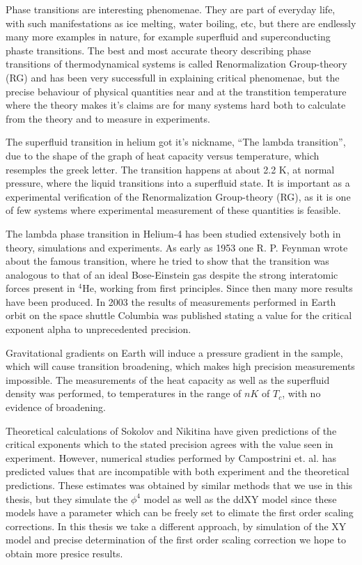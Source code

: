 %

Phase transitions are interesting phenomenae. They are part of everyday life, with such manifestations as ice melting, water boiling, etc, but there are endlessly many more examples in nature, for example superfluid and superconducting phaste transitions. The best and most accurate theory describing phase transitions of thermodynamical systems is called Renormalization Group-theory (RG) and has been very successfull in explaining critical phenomenae, but the precise behaviour of physical quantities near and at the transtition temperature where the theory makes it's claims are for many systems hard both to calculate from the theory and to measure in experiments.

The superfluid transition in helium got it's nickname, ``The lambda transition'', due to the shape of the graph of heat capacity versus temperature, which resemples the greek letter. The transition happens at about 2.2 K, at normal pressure, where the liquid transitions into a superfluid state. It is important as a experimental verification of the Renormalization Group-theory (RG), as it is one of few systems where experimental measurement of these quantities is feasible. 

The lambda phase transition in Helium-4 has been studied extensively both in theory, simulations and experiments. As early as 1953 one R. P. Feynman wrote about the famous transition, where he tried to show that the transition was analogous to that of an ideal Bose-Einstein gas despite the strong interatomic forces present in $^4$He, working from first principles.
Since then many more results have been produced.
In 2003 the results of measurements performed in Earth orbit on the space shuttle Columbia was published\cite{Lipa2003} stating a value for the critical exponent alpha to unprecedented precision. 

Gravitational gradients on Earth will induce a pressure gradient in the sample, which will cause transition broadening, which makes high precision measurements impossible.
The measurements of the heat capacity as well as the superfluid density was performed, to temperatures in the range of $nK$ of $T_c$, with no evidence of broadening.

Theoretical calculations of Sokolov and Nikitina \cite{Sokolov2016} have given predictions of the critical exponents which to the stated precision agrees with the value seen in experiment.
However, numerical studies performed by Campostrini et. al. \cite{Campostrini2006} has predicted values that are incompatible with both experiment and the theoretical predictions. These estimates was obtained by similar methods that we use in this thesis, but they simulate the $\phi^4$ model as well as the ddXY model since these models have a parameter which can be freely set to elimate the first order scaling corrections. In this thesis we take a different approach, by simulation of the XY model and precise determination of the first order scaling correction we hope to obtain more presice results.


